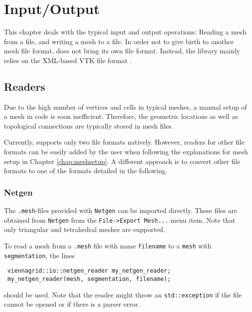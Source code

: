 \chapter{Input/Output} \label{chap:io}

This chapter deals with the typical input and output operations: Reading a mesh from a file, and writing a mesh to a file.
In order not to give birth to another mesh file format, {\ViennaGrid} does not bring its own file format.
Instead, the library mainly relies on the XML-based VTK \cite{VTK} file format \cite{VTKfileformat}.




\section{Readers}
Due to the high number of vertices and cells in typical meshes,
a manual setup of a mesh in code is soon inefficient. Therefore,
the geometric locations as well as topological connections are typically stored in mesh files.

Currently, {\ViennaGrid} supports only two file formats natively. However, readers for other file formats
can be easily added by the user when following the explanations for mesh setup in Chapter \ref{chap:meshsetup}.
A different approach is to convert other file formats to one of the formats detailed in the following.


 \subsection{Netgen}
 The \texttt{.mesh}-files provided with \texttt{Netgen} \cite{netgen} can be imported directly.
 These files are obtained from \texttt{Netgen} from the \texttt{File->Export Mesh...} menu item. Note that only triangular and tetrahedral meshes are supported.

 To read a mesh from a \texttt{.mesh} file with name \lstinline|filename| to a \lstinline|mesh| with \lstinline|segmentation|, the lines
 \begin{lstlisting}
 viennagrid::io::netgen_reader my_netgen_reader;
 my_netgen_reader(mesh, segmentation, filename);
 \end{lstlisting}
 should be used. Note that the reader might throw an \lstinline|std::exception| if the file cannot be opened or if there is a parser error.

